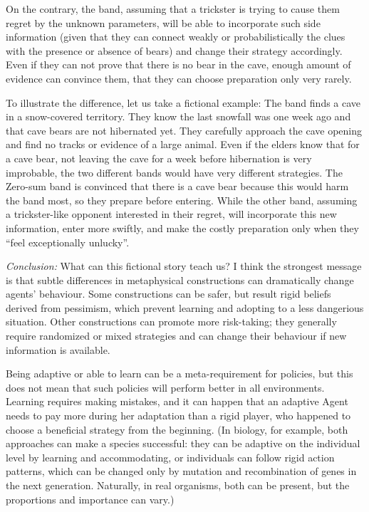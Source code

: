 \documentclass{article}
\begin{document}
On the contrary, the band, assuming that a trickster is trying to cause them regret by the unknown parameters, will be able to incorporate such side information (given that they can connect weakly or probabilistically the clues with the presence or absence of bears) and change their strategy accordingly.
Even if they can not prove that there is no bear in the cave, enough amount of evidence can convince them, that they can choose preparation only very rarely.

To illustrate the difference, let us take a fictional example:
The band finds a cave in a snow-covered territory. They know the last snowfall was one week ago and that cave bears are not hibernated yet. They carefully approach the cave opening and find no tracks or evidence of a large animal.
Even if the elders know that for a cave bear, not leaving the cave for a week before hibernation is very improbable, the two different bands would have very different strategies.
The Zero-sum band is convinced that there is a cave bear because this would harm the band most, so they prepare before entering.
While the other band, assuming a trickster-like opponent interested in their regret, will incorporate this new information, enter more swiftly, and make the costly preparation only when they ``feel exceptionally unlucky''.

{\it Conclusion:}
What can this fictional story teach us? I think the strongest message is that subtle differences in metaphysical constructions can dramatically change agents' behaviour.
Some constructions can be safer, but result rigid beliefs derived from pessimism, which prevent learning and adopting to a less dangerious situation.
Other constructions can promote more risk-taking; they generally require randomized or mixed strategies and can change their behaviour if new information is available.

Being adaptive or able to learn can be a meta-requirement for policies, but this does not mean that such policies will perform better in all environments.
Learning requires making mistakes, and it can happen that an adaptive Agent needs to pay more during her adaptation than a rigid player, who happened to choose a beneficial strategy from the beginning.
(In biology, for example, both approaches can make a species successful: they can be adaptive on the individual level by learning and accommodating, or individuals can follow rigid action patterns, which can be changed only by mutation and recombination of genes in the next generation. Naturally, in real organisms, both can be present, but the proportions and importance can vary.)
\end{document}
